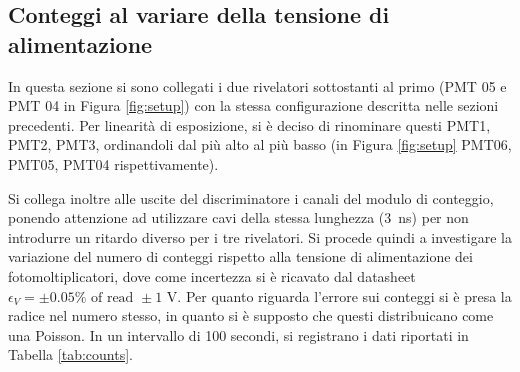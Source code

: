 \documentclass[10pt,a4paper]{article}
\begin{document}
\subsection{Conteggi al variare della tensione di alimentazione}
In questa sezione si sono collegati i due rivelatori sottostanti al primo (PMT 05 e PMT 04 in Figura \ref{fig:setup}) con la stessa configurazione descritta nelle sezioni precedenti. Per linearità di esposizione, si è deciso di rinominare questi PMT1, PMT2, PMT3, ordinandoli dal più alto al più basso (in Figura \ref{fig:setup} PMT06, PMT05, PMT04 rispettivamente). 

Si collega inoltre alle uscite del discriminatore i canali del modulo di conteggio, ponendo attenzione ad utilizzare cavi della stessa lunghezza (\SI{3}{\nano \second}) per non introdurre un ritardo diverso per i tre rivelatori. Si procede quindi a investigare la variazione del numero di conteggi rispetto alla tensione di alimentazione dei fotomoltiplicatori, dove come incertezza si è ricavato dal datasheet $\epsilon_V=\pm0.05\% \text{ of read } \pm1 \text{ V}$. Per quanto riguarda l'errore sui conteggi si è presa la radice nel numero stesso, in quanto si è supposto che questi distribuicano come una Poisson.
In un intervallo di 100 secondi, si registrano i dati riportati in Tabella \ref{tab:counts}.
\end{document}
